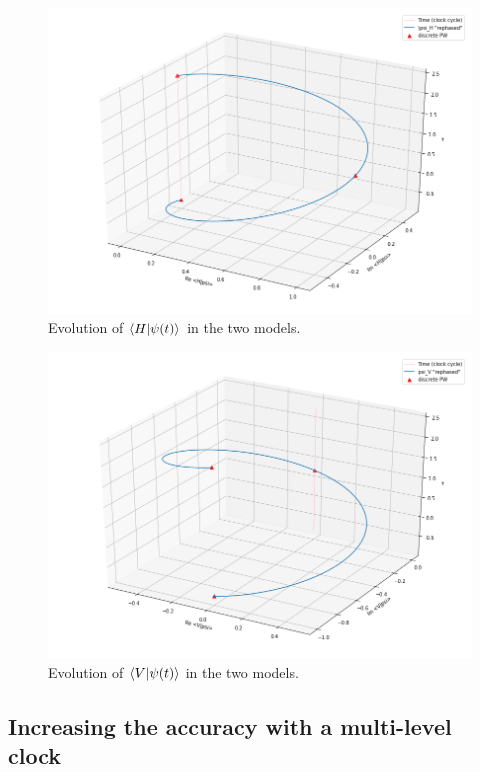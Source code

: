 \begin{figure}
  \includegraphics[width=\textwidth]{img/psi_H.png}
  \caption{
    Evolution of $\braket{H}{\psi(t)}$ in the two models.
  }
  \label{fig:psi_H}
\end{figure}

\begin{figure}
  \includegraphics[width=\textwidth]{img/psi_V.png}
  \caption{Evolution of $\braket{V}{\psi(t)}$ in the two models.}
  \label{fig:psi_V}
\end{figure}

\subsection{Increasing the accuracy with a multi-level clock}

